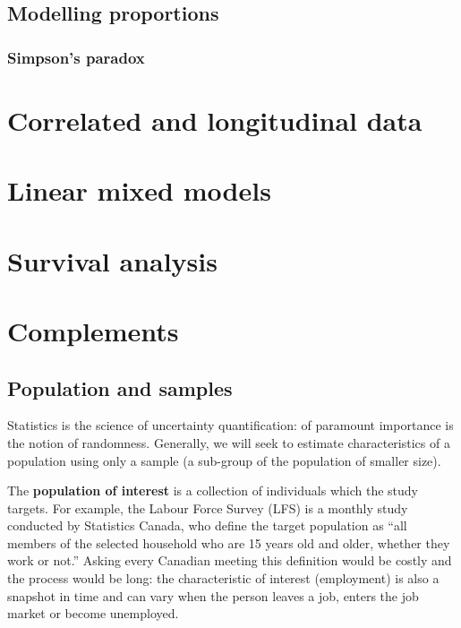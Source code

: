 \documentclass[
  11pt,
  letterpaper,
]{book}
\theoremstyle{definition}
\theoremstyle{definition}
\theoremstyle{definition}
\theoremstyle{remark}
\begin{document}
\hypertarget{modelling-proportions}{%
\section{Modelling proportions}\label{modelling-proportions}}

\hypertarget{simpsons-paradox}{%
\subsection{Simpson's paradox}\label{simpsons-paradox}}

\hypertarget{correlated-longitudinal-data}{%
\chapter{Correlated and longitudinal data}\label{correlated-longitudinal-data}}

\hypertarget{linear-mixed-models}{%
\chapter{Linear mixed models}\label{linear-mixed-models}}

\hypertarget{survival}{%
\chapter{Survival analysis}\label{survival}}

\hypertarget{appendix-appendix}{%
\appendix}


\hypertarget{complement}{%
\chapter{Complements}\label{complement}}

\hypertarget{population-sample}{%
\section{Population and samples}\label{population-sample}}

Statistics is the science of uncertainty quantification: of paramount importance is the notion of randomness. Generally, we will seek to estimate characteristics of a population using only a sample (a sub-group of the population of smaller size).

The \textbf{population of interest} is a collection of individuals which the study targets. For example, the Labour Force Survey (LFS) is a monthly study conducted by Statistics Canada, who define the target population as ``all members of the selected household who are 15 years old and older, whether they work or not.'' Asking every Canadian meeting this definition would be costly and the process would be long: the characteristic of interest (employment) is also a snapshot in time and can vary when the person leaves a job, enters the job market or become unemployed.
\end{document}
